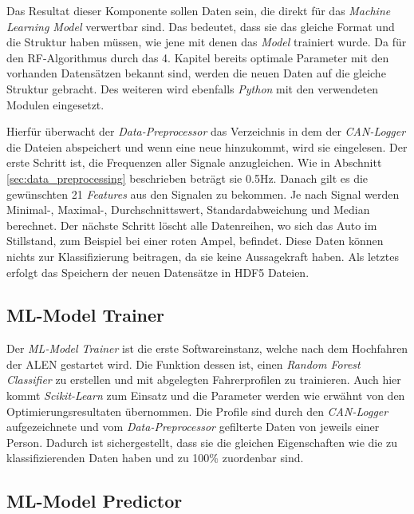 Das Resultat dieser Komponente sollen Daten sein, die direkt für das \textit{Machine Learning Model} verwertbar sind. Das bedeutet, dass sie das gleiche Format und die Struktur haben müssen, wie jene mit denen das \textit{Model} trainiert wurde. Da für den RF-Algorithmus durch das 4. Kapitel bereits optimale Parameter mit den vorhanden Datensätzen bekannt sind, werden die neuen Daten auf die gleiche Struktur gebracht. Des weiteren wird ebenfalls \textit{Python} mit den verwendeten Modulen eingesetzt.

Hierfür überwacht der \textit{Data-Preprocessor} das Verzeichnis in dem der \textit{CAN-Logger} die Dateien abspeichert und wenn eine neue hinzukommt, wird sie eingelesen. Der erste Schritt ist, die Frequenzen aller Signale anzugleichen. Wie in Abschnitt \ref{sec:data_preprocessing} beschrieben beträgt sie 0.5Hz. Danach gilt es die gewünschten 21 \textit{Features} aus den Signalen zu bekommen. Je nach Signal werden Minimal-, Maximal-, Durchschnittswert, Standardabweichung und Median berechnet. Der nächste Schritt löscht alle Datenreihen, wo sich das Auto im Stillstand, zum Beispiel bei einer roten Ampel, befindet. Diese Daten können nichts zur Klassifizierung beitragen, da sie keine Aussagekraft haben. Als letztes erfolgt das Speichern der neuen Datensätze in HDF5 Dateien.

\subsection{ML-Model Trainer}
\label{sec:ml_model_trainer}

Der \textit{ML-Model Trainer} ist die erste Softwareinstanz, welche nach dem Hochfahren der ALEN gestartet wird. Die Funktion dessen ist, einen \textit{Random Forest Classifier} zu erstellen und mit abgelegten Fahrerprofilen zu trainieren. Auch hier kommt \textit{Scikit-Learn} zum Einsatz und die Parameter werden wie erwähnt von den Optimierungsresultaten übernommen. Die Profile sind durch den \textit{CAN-Logger} aufgezeichnete und vom \textit{Data-Preprocessor} gefilterte Daten von jeweils einer Person. Dadurch ist sichergestellt, dass sie die gleichen Eigenschaften wie die zu klassifizierenden Daten haben und zu 100\% zuordenbar sind.

\subsection{ML-Model Predictor}
\label{sec:ml_model_predictor}

